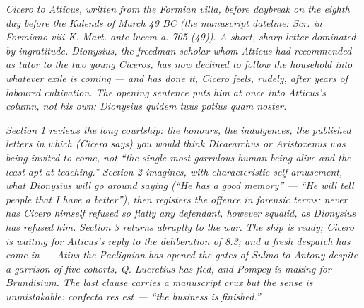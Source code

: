 
\textit{Cicero to Atticus, written from the Formian
villa, before daybreak on the eighth day before the
Kalends of March 49 BC (the manuscript dateline:
\textit{Scr. in Formiano viii K. Mart. ante lucem a.
705 (49)}). A short, sharp letter dominated by
ingratitude. Dionysius, the freedman scholar whom
Atticus had recommended as tutor to the two young
Ciceros, has now declined to follow the household into
whatever exile is coming --- and has done it, Cicero
feels, rudely, after years of laboured cultivation. The
opening sentence puts him at once into Atticus's
column, not his own: \textit{Dionysius quidem tuus
potius quam noster}.}

\textit{Section 1 reviews the long courtship: the
honours, the indulgences, the published letters in
which (Cicero says) you would think Dicaearchus or
Aristoxenus was being invited to come, not ``the single
most garrulous human being alive and the least apt at
teaching.'' Section 2 imagines, with characteristic
self-amusement, what Dionysius will go around saying
(``He has a good memory'' --- ``He will tell people
that I have a better''), then registers the offence in
forensic terms: never has Cicero himself refused so
flatly any defendant, however squalid, as Dionysius has
refused him. Section 3 returns abruptly to the war.
The ship is ready; Cicero is waiting for Atticus's
reply to the deliberation of 8.3; and a fresh despatch
has come in --- Atius the Paelignian has opened the
gates of Sulmo to Antony despite a garrison of five
cohorts, Q. Lucretius has fled, and Pompey is making
for Brundisium. The last clause carries a manuscript
crux but the sense is unmistakable: \textit{confecta
res est} --- ``the business is finished.''}
